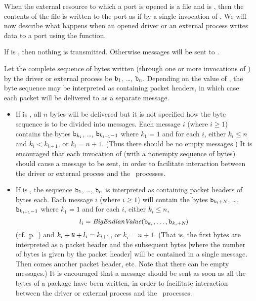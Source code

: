 When the external resource to which a port  is opened is a file and  is
, then the contents of the file is written to the port as if by a single invocation
of .  We will now describe what happens when an opened driver or an external process writes
data to a port using the  function.

If  is , then nothing is transmitted.
Otherwise messages will be sent to
.

Let the complete sequence of bytes written (through one or more invocations of )
by the driver or external process be ${\tt{\sl b}}_1$, \ldots, ${\tt{\sl b}}_n$.
Depending on the value of , the byte sequence may be
interpreted as containing packet headers, in which case each packet will be
delivered to  as a separate message.
\begin{itemize}
\item {}
If  is , all $n$ bytes will be delivered but
it is not specified how the byte sequence is to be divided into messages.
Each message $i$ (where $i\geq1$) contains the bytes
${\tt{\sl b}}_{k_i}$, \ldots, ${\tt{\sl b}}_{k_{i+1}-1}$ where $k_1=1$ and for each $i$, either $k_i\leq n$ and
$k_i<k_{i+1}$, or $k_i=n+1$.  (Thus there should be no empty messages.)  It is encouraged that
each invocation of  (with a nonempty sequence of bytes) should cause a message to be
sent, in order to facilitate interaction between the driver or external process and the \Erlang\
processes.
\item {}
If  is , the sequence ${\tt{\sl b}}_1$, \ldots, ${\tt{\sl b}}_n$ is
interpreted as containing packet headers of \TZ{N} bytes each.  Each message $i$ (where $i\geq1$)
will contain the bytes ${\tt{\sl b}}_{k_i+\mbox{\scriptsize\tt{\sl{N}}}}$, \ldots, ${\tt{\sl b}}_{k_{i+1}-1}$ where $k_1=1$ and for each $i$,
either $k_i\leq n$,
\[l_i = {\it BigEndianValue}({\tt{\sl b}}_{k_i}, \ldots, {\tt{\sl b}}_{k_i+\mbox{\scriptsize\tt{\sl{N}}}})\]
(cf.\ p.~\pageref{page:big-endian})
and $k_i++l_i=k_{i+1}$, or $k_i= n+1$.  
(That is, the first \TZ{N} bytes are interpreted as a packet header and the subsequent
bytes [where the number of bytes is given by the packet header] will be contained in a
single message.  Then comes another packet header, etc.  Note that there can be empty messages.)
It is encouraged that a message should be sent as soon as all the bytes of a package have been
written, in order to facilitate interaction between the driver or external process and the \Erlang\
processes.
\index{port!packet mode|)}
\end{itemize}
